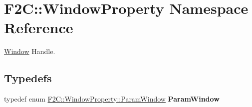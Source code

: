 \hypertarget{namespace_f2_c_1_1_window_property}{
\section{F2C::WindowProperty Namespace Reference}
\label{namespace_f2_c_1_1_window_property}
}


\hyperlink{class_f2_c_1_1_window}{Window} Handle.  


\subsection*{Typedefs}
\begin{DoxyCompactItemize}
\item 
\hypertarget{namespace_f2_c_1_1_window_property_a48325d0136749622911ee0d4a6433a09}{
typedef enum \hyperlink{namespace_f2_c_1_1_window_property_a89ec69d0a86f9d0063dfb69a3ebf3fbe}{F2C::WindowProperty::ParamWindow} {\bfseries ParamWindow}}
\label{namespace_f2_c_1_1_window_property_a48325d0136749622911ee0d4a6433a09}

\end{DoxyCompactItemize}
